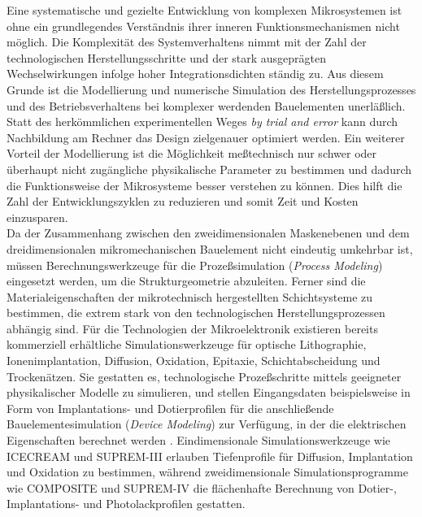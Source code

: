 Eine systematische und gezielte Entwicklung von komplexen Mikrosystemen
ist ohne ein grundlegendes Verständnis ihrer inneren Funktionsmechanismen
nicht möglich.
Die Komplexität des Systemverhaltens nimmt mit der Zahl der technologischen
Herstellungsschritte und der stark ausgeprägten Wechselwirkungen infolge
hoher Integrationsdichten ständig zu. Aus diesem Grunde ist die
Modellierung und numerische Simulation des Herstellungsprozesses und des
Betriebsverhaltens bei komplexer werdenden Bauelementen unerläßlich.
Statt des herkömmlichen experimentellen Weges
{\em \glqq by trial and error\grqq} \/ kann durch Nachbildung
am Rechner das Design zielgenauer optimiert werden. Ein weiterer Vorteil
der Modellierung ist die Möglichkeit meßtechnisch nur schwer oder
überhaupt nicht zugängliche physikalische Parameter zu bestimmen und
dadurch die Funktionsweise der Mikrosysteme besser verstehen zu können.
Dies hilft die Zahl der Entwicklungszyklen zu reduzieren und somit Zeit
und Kosten einzusparen.\\
Da der Zusammenhang zwischen den zweidimensionalen Maskenebenen und dem
drei\-dimensionalen mikromechanischen Bauelement nicht eindeutig umkehrbar
ist,
müssen Berechnungswerkzeuge für die Prozeßsimulation ({\sl Process Modeling})
eingesetzt werden, um die Strukturgeometrie abzuleiten.
Ferner sind die Materialeigenschaften der mikrotechnisch hergestellten
Schichtsysteme zu bestimmen, die extrem stark von den technologischen
Herstellungsprozessen abhängig sind. Für die Technologien der
Mikroelektronik existieren bereits kommerziell erhältliche
Simulationswerkzeuge für optische Lithographie, Ionenimplantation,
Diffusion, Oxidation, Epitaxie, Schichtabscheidung und Trockenätzen.
Sie gestatten es, technologische Prozeßschritte mittels
geeigneter physikalischer Modelle zu simulieren, und stellen
Eingangsdaten beispielsweise in Form von Implantations- und Dotierprofilen
für die anschließende Bauelementesimulation ({\sl Device Modeling}) zur
Verfügung, in der die elektrischen Eigenschaften berechnet werden
\cite{Lor85}. Eindimensionale
Simulationswerkzeuge wie {\sf ICECREAM} \cite{Pic90} und {\sf SUPREM-III}
\cite{TMA} erlauben Tiefenprofile für Diffusion, Implantation und Oxidation
zu bestimmen, während zweidimensionale Simulationsprogramme wie
{\sf COMPOSITE} \cite{COMP} und {\sf SUPREM-IV} \cite{TMA} die flächenhafte
Berechnung von Dotier-, Implantations- und  Photolackprofilen
gestatten.\\
